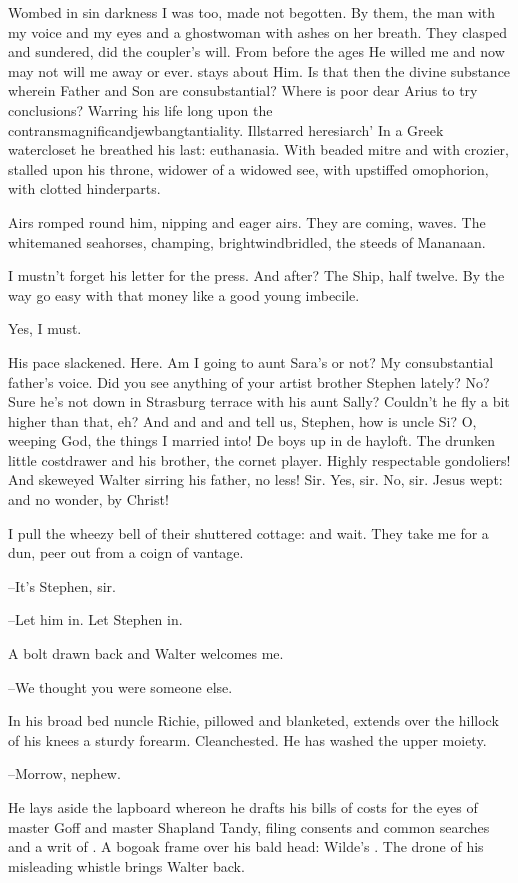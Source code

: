 Wombed in sin darkness I was too, made not begotten.
By them, the man with my voice and my eyes
and a ghostwoman with ashes on her breath.
They clasped and sundered, did the coupler's will.
From before the ages
He willed me
and now may not will me away or ever.
 stays about Him.
Is that then the divine substance wherein Father and Son are consubstantial?
Where is poor dear Arius to try conclusions?
Warring his life long upon the contransmagnificandjewbangtantiality.
Illstarred heresiarch'
In a Greek watercloset he breathed his last:
euthanasia.
With beaded mitre and with crozier,
stalled upon his throne,
widower of a widowed see,
with upstiffed omophorion,
with clotted hinderparts.

Airs romped round him, nipping and eager airs.
They are coming,
waves.
The whitemaned seahorses, champing,
brightwindbridled,
the steeds of Mananaan.

I mustn't forget his letter for the press.
And after?
The Ship, half twelve.
By the way
go easy with that money like a good young imbecile.

Yes, I must.

His pace slackened.
Here.
Am I going to aunt Sara's or not?
My consubstantial father's voice.
Did you see anything of your artist brother Stephen lately?
No?
Sure he's not down in Strasburg terrace with his aunt Sally?
Couldn't he fly a bit higher than that, eh?
And and and and tell us, Stephen,
how is uncle Si?
O, weeping God, the things I married into!
De boys up in de hayloft.
The drunken little costdrawer
and his brother, the cornet player.
Highly respectable gondoliers!
And skeweyed Walter sirring his father, no less!
Sir.
Yes, sir.
No, sir.
Jesus wept:
and no wonder, by Christ!

I pull the wheezy bell of their shuttered cottage:
and wait.
They take me for a dun,
peer out from a coign of vantage.

--It's Stephen, sir.

--Let him in.
Let Stephen in.

A bolt drawn back and Walter welcomes me.

--We thought you were someone else.

In his broad bed
nuncle Richie, pillowed and blanketed,
extends over the hillock of his knees a sturdy forearm.
Cleanchested.
He has washed the upper moiety.

--Morrow, nephew.

He lays aside the lapboard whereon he drafts his bills of costs
for the eyes of master Goff and master Shapland Tandy,
filing consents and common searches and a writ of .
A bogoak frame over his bald head:
Wilde's .
The drone of his misleading whistle brings Walter back.

